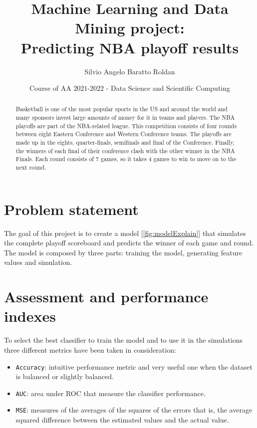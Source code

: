\documentclass{article}
\title{Machine Learning and Data Mining project:\\Predicting NBA playoff results}
\author{Silvio Angelo Baratto Roldan}
\date{Course of AA $2021$-$2022$ - Data Science and Scientific Computing}
\begin{document}
\maketitle

\begin{abstract}
Basketball is one of the most popular sports in the US and around the world and many sponsors invest large amounts of money for it
in teams and players. The NBA playoffs are part of the NBA-related league. This competition consists of four rounds between eight Eastern Conference and Western Conference teams. The playoffs are made up in the eights, quarter-finals, semifinals and final of the Conference. Finally, the winners of each final of their conference clash with the other winner in the NBA Finals. Each round consists of 7 games, so it takes 4 games to win to move on to the next round.
\end{abstract}
\section{Problem statement}
\label{section: ProblemStatement}
The goal of this project is to create a model [\ref{fig:modelExplain}] that simulates the complete playoff scoreboard and predicts the winner of each game and round. The model is composed by three parts: training the model, generating feature values and simulation.
\section{Assessment and performance indexes}
\label{section: AssesmentPerformanceIndexes}
To select the best classifier to train the model and to use it in the simulations three different metrics have been taken in consideration:
\begin{itemize}
\item{\texttt{Accuracy}}: intuitive performance metric and very useful one when the dataset is balanced or slightly balanced.
\item{\texttt{AUC}}: area under ROC that measure the classifier performance.
\item{\texttt{MSE}}: measures of the averages of the squares of the errors that is, the average squared difference between the estimated values and the actual value.
\end{itemize}
\end{document}
